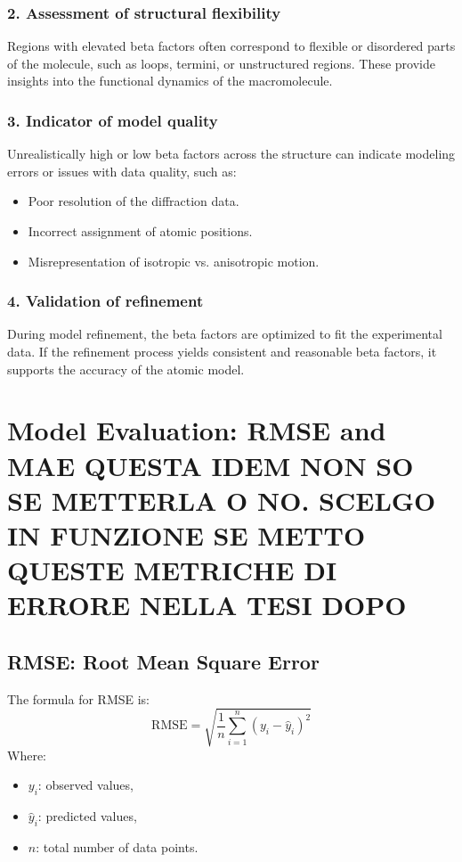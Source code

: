 \documentclass[English, Lau, oneside]{sapthesis}
\begin{document}
\subsubsection{2. Assessment of structural flexibility}
Regions with elevated beta factors often correspond to flexible or disordered parts of the molecule, such as loops, termini, or unstructured regions. These provide insights into the functional dynamics of the macromolecule.

\subsubsection{3. Indicator of model quality}
Unrealistically high or low beta factors across the structure can indicate modeling errors or issues with data quality, such as:
\begin{itemize}
    \item Poor resolution of the diffraction data.
    \item Incorrect assignment of atomic positions.
    \item Misrepresentation of isotropic vs. anisotropic motion.
\end{itemize}
\subsubsection{4. Validation of refinement}
\noindent During model refinement, the beta factors are optimized to fit the experimental data. If the refinement process yields consistent and reasonable beta factors, it supports the accuracy of the atomic model.
\newpage


\section{Model Evaluation: RMSE and MAE    {QUESTA IDEM NON SO SE METTERLA O NO. SCELGO IN FUNZIONE SE METTO QUESTE METRICHE DI ERRORE NELLA TESI DOPO}
}\label{sec:Evaluation}
\subsection{RMSE: Root Mean Square Error}
\noindent The formula for RMSE is:
\[
\text{RMSE} = \sqrt{\frac{1}{n} \sum_{i=1}^n (y_i - \hat{y}_i)^2}
\]
Where:
\begin{itemize}
    \item \(y_i\): observed values,
    \item \(\hat{y}_i\): predicted values,
    \item \(n\): total number of data points.
\end{itemize}
\end{document}
